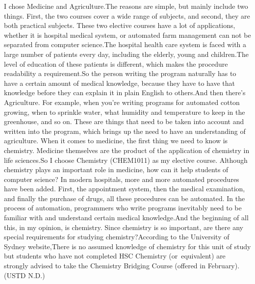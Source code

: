 \documentclass{article}
\begin{document}
I chose Medicine and Agriculture.The reasons are simple, but mainly include two things. First, the two courses cover a wide range of subjects, and second, they are both practical subjects.
These two elective courses have a lot of applications, whether it is hospital medical system, or automated farm management can not be separated from computer science.The hospital health care system is faced with a large number of patients every day, including the elderly, young and children.The level of education of these patients is different, which makes the procedure readability a requirement.So the person writing the program naturally has to have a certain amount of medical knowledge, because they have to have that knowledge before they can explain it in plain English to others.And then there's Agriculture. For example, when you're writing programs for automated cotton growing, when to sprinkle water, what humidity and temperature to keep in the greenhouse, and so on. These are things that need to be taken into account and written into the program, which brings up the need to have an understanding of agriculture.
When it comes to medicine, the first thing we need to know is chemistry. Medicine themselves are the product of the application of chemistry in life sciences.So I choose Chemistry (CHEM1011) as my elective course. Although chemistry plays an important role in medicine, how can it help students of computer science? In modern hospitals, more and more automated procedures have been added. First, the appointment system, then the medical examination, and finally the purchase of drugs, all these procedures can be automated. In the process of automation, programmers who write programs inevitably need to be familiar with and understand certain medical knowledge.And the beginning of all this, in my opinion, is chemistry. Since chemistry is so important, are there any special requirements for studying chemistry?According to the University of Sydney website,There is no assumed knowledge of chemistry for this unit of study but students who have not completed HSC Chemistry (or equivalent) are strongly advised to take the Chemistry Bridging Course (offered in February).(USTD N.D.)
\end{document}
